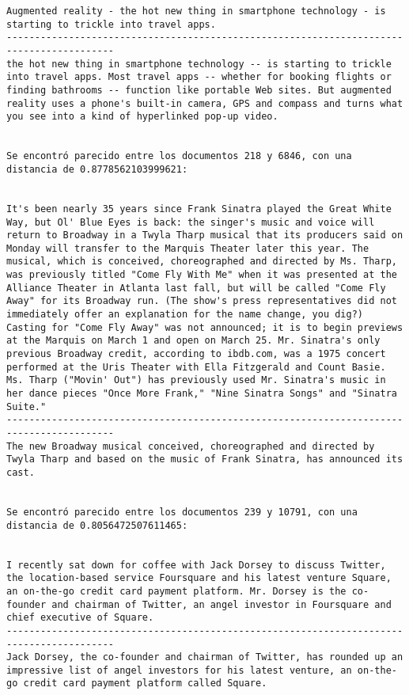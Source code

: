 \documentclass[11pt]{article}
\begin{document}
\begin{Verbatim}[commandchars=\\\{\}]
Augmented reality - the hot new thing in smartphone technology - is starting to trickle into travel apps.
-----------------------------------------------------------------------------------------
the hot new thing in smartphone technology -- is starting to trickle into travel apps. Most travel apps -- whether for booking flights or finding bathrooms -- function like portable Web sites. But augmented reality uses a phone's built-in camera, GPS and compass and turns what you see into a kind of hyperlinked pop-up video.


Se encontró parecido entre los documentos 218 y 6846, con una distancia de 0.8778562103999621:


It's been nearly 35 years since Frank Sinatra played the Great White Way, but Ol' Blue Eyes is back: the singer's music and voice will return to Broadway in a Twyla Tharp musical that its producers said on Monday will transfer to the Marquis Theater later this year. The musical, which is conceived, choreographed and directed by Ms. Tharp, was previously titled "Come Fly With Me" when it was presented at the Alliance Theater in Atlanta last fall, but will be called "Come Fly Away" for its Broadway run. (The show's press representatives did not immediately offer an explanation for the name change, you dig?) Casting for "Come Fly Away" was not announced; it is to begin previews at the Marquis on March 1 and open on March 25. Mr. Sinatra's only previous Broadway credit, according to ibdb.com, was a 1975 concert performed at the Uris Theater with Ella Fitzgerald and Count Basie. Ms. Tharp ("Movin' Out") has previously used Mr. Sinatra's music in her dance pieces "Once More Frank," "Nine Sinatra Songs" and "Sinatra Suite."
-----------------------------------------------------------------------------------------
The new Broadway musical conceived, choreographed and directed by Twyla Tharp and based on the music of Frank Sinatra, has announced its cast.


Se encontró parecido entre los documentos 239 y 10791, con una distancia de 0.8056472507611465:


I recently sat down for coffee with Jack Dorsey to discuss Twitter, the location-based service Foursquare and his latest venture Square, an on-the-go credit card payment platform. Mr. Dorsey is the co-founder and chairman of Twitter, an angel investor in Foursquare and chief executive of Square.
-----------------------------------------------------------------------------------------
Jack Dorsey, the co-founder and chairman of Twitter, has rounded up an impressive list of angel investors for his latest venture, an on-the-go credit card payment platform called Square.



\end{Verbatim}
\end{document}
